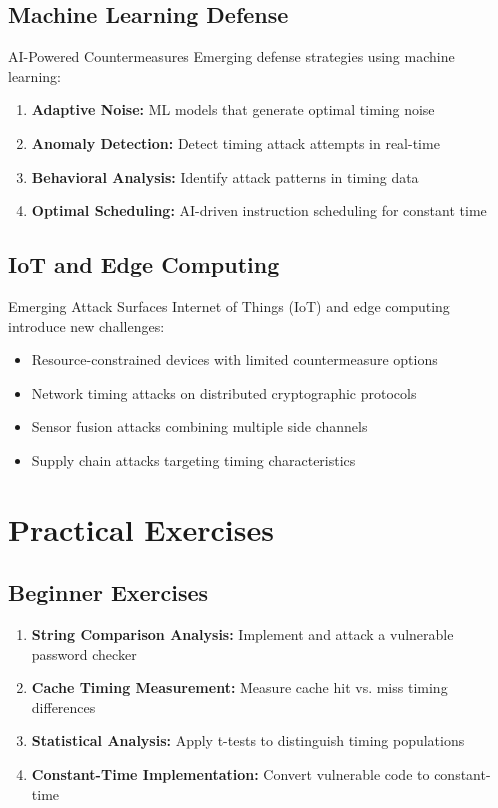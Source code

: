 \documentclass[12pt,a4paper]{article}
\theoremstyle{definition}
\begin{document}
\subsection{Machine Learning Defense}

\begin{definitionbox}{AI-Powered Countermeasures}
Emerging defense strategies using machine learning:
\begin{enumerate}
    \item \textbf{Adaptive Noise:} ML models that generate optimal timing noise
    \item \textbf{Anomaly Detection:} Detect timing attack attempts in real-time
    \item \textbf{Behavioral Analysis:} Identify attack patterns in timing data
    \item \textbf{Optimal Scheduling:} AI-driven instruction scheduling for constant time
\end{enumerate}
\end{definitionbox}

\subsection{IoT and Edge Computing}

\begin{warningbox}{Emerging Attack Surfaces}
Internet of Things (IoT) and edge computing introduce new challenges:
\begin{itemize}
    \item Resource-constrained devices with limited countermeasure options
    \item Network timing attacks on distributed cryptographic protocols
    \item Sensor fusion attacks combining multiple side channels
    \item Supply chain attacks targeting timing characteristics
\end{itemize}
\end{warningbox}

\section{Practical Exercises}

\subsection{Beginner Exercises}

\begin{enumerate}
    \item \textbf{String Comparison Analysis:} Implement and attack a vulnerable password checker
    \item \textbf{Cache Timing Measurement:} Measure cache hit vs. miss timing differences
    \item \textbf{Statistical Analysis:} Apply t-tests to distinguish timing populations
    \item \textbf{Constant-Time Implementation:} Convert vulnerable code to constant-time
\end{enumerate}
\end{document}
